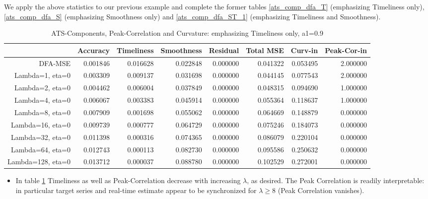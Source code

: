 \documentclass[a4paper]{book}
\begin{document}
We apply the above statistics to our previous example and complete the former tables \ref{ats_comp_dfa_T} (emphasizing Timeliness only), \ref{ats_comp_dfa_S} (emphasizing Smoothness only) and \ref{ats_comp_dfa_ST_1} (emphasizing Timeliness and Smoothness). 
\begin{table}[ht]
\centering
\begin{tabular}{rrrrrrrr}
  \hline
 & Accuracy & Timeliness & Smoothness & Residual & Total MSE & Curv-in & Peak-Cor-in \\ 
  \hline
DFA-MSE & 0.001846 & 0.016628 & 0.022848 & 0.000000 & 0.041322 & 0.053495 & 2.000000 \\ 
  Lambda=1, eta=0 & 0.003309 & 0.009137 & 0.031698 & 0.000000 & 0.044145 & 0.077543 & 2.000000 \\ 
  Lambda=2, eta=0 & 0.004462 & 0.006004 & 0.037849 & 0.000000 & 0.048315 & 0.094690 & 1.000000 \\ 
  Lambda=4, eta=0 & 0.006067 & 0.003383 & 0.045914 & 0.000000 & 0.055364 & 0.118637 & 1.000000 \\ 
  Lambda=8, eta=0 & 0.007909 & 0.001698 & 0.055062 & 0.000000 & 0.064669 & 0.148879 & 0.000000 \\ 
  Lambda=16, eta=0 & 0.009739 & 0.000777 & 0.064729 & 0.000000 & 0.075246 & 0.184073 & 0.000000 \\ 
  Lambda=32, eta=0 & 0.011398 & 0.000316 & 0.074365 & 0.000000 & 0.086079 & 0.220104 & 0.000000 \\ 
  Lambda=64, eta=0 & 0.012743 & 0.000113 & 0.082730 & 0.000000 & 0.095586 & 0.250632 & 0.000000 \\ 
  Lambda=128, eta=0 & 0.013712 & 0.000037 & 0.088780 & 0.000000 & 0.102529 & 0.272001 & 0.000000 \\ 
   \hline
\end{tabular}
\caption{ATS-Components, Peak-Correlation and Curvature: emphasizing Timeliness only, a1=0.9} 
\label{ats_comp_dfa_T_1_pc}
\end{table}\begin{itemize}
\item In table \ref{ats_comp_dfa_T_1_pc} Timeliness as well as Peak-Correlation decrease with increasing $\lambda$, as desired. The Peak Correlation is readily interpretable: in particular target series and real-time estimate appear to be  synchronized for $\lambda\geq 8$ (Peak Correlation vanishes).
\begin{table}[ht]

\end{table}
\end{itemize}
\end{document}
